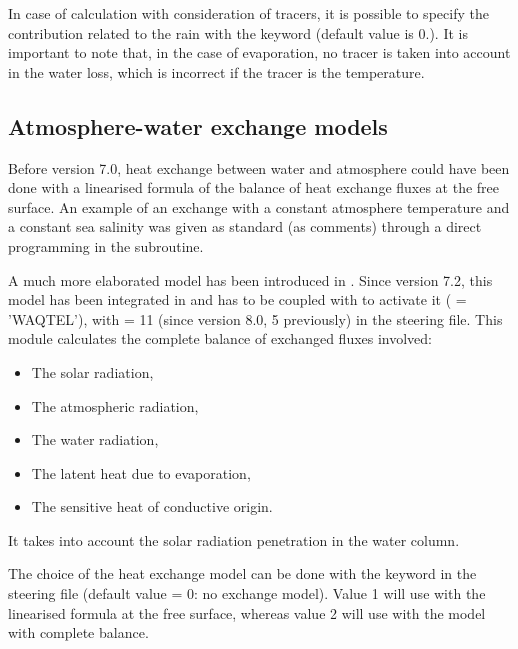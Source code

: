 In case of calculation with consideration of tracers, it is possible to specify
the contribution related to the rain with the keyword  (default value is 0.). It is important to note that, in the case
of evaporation, no tracer is taken into account in the water loss, which is
incorrect if the tracer is the temperature.

\subsection{Atmosphere-water exchange models}

Before version 7.0, heat exchange between water and atmosphere could have been
done with a linearised formula of the balance of heat exchange fluxes at the
free surface. An example of an exchange with a constant atmosphere temperature
and a constant sea salinity was given as standard (as comments) through a
direct programming in the  subroutine.

A much more elaborated model has been introduced in .
Since version 7.2, this model has been integrated in \waqtel and
 has to be coupled with \waqtel to activate it
( = 'WAQTEL'), with
 = 11 (since version 8.0, 5 previously)
in the \waqtel steering file.
This module calculates the complete balance of exchanged fluxes involved:

\begin{itemize}
\item  The solar radiation,

\item  The atmospheric radiation,

\item  The water radiation,

\item  The latent heat due to evaporation,

\item  The sensitive heat of conductive origin.
\end{itemize}

It takes into account the solar radiation penetration in the water column.

The choice of the heat exchange model can be done with the keyword
 in the \waqtel steering file
(default value = 0: no exchange
model). Value 1 will use with the linearised formula at the free surface,
whereas value 2 will use with the model with complete balance.

